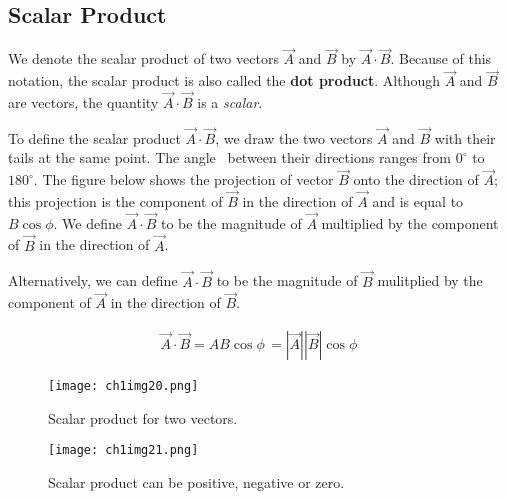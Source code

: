 \subsection*{Scalar Product}
We denote the scalar product of two vectors $\overrightarrow{A}$ and $\overrightarrow{B}$ by $\overrightarrow{A} \cdot \overrightarrow{B}$. Because of this notation, the scalar product is also called the \textbf{dot product}. Although $\overrightarrow{A}$ and $\overrightarrow{B}$ are vectors, the quantity $\overrightarrow{A} \cdot \overrightarrow{B}$ is a \textit{scalar}.

To define the scalar product $\overrightarrow{A} \cdot \overrightarrow{B}$, we draw the two vectors $\overrightarrow{A}$ and $\overrightarrow{B}$ with their tails at the same point. The angle \phi\, between their directions ranges from $0^\circ$ to $180^\circ$. The figure below shows the projection of vector $\overrightarrow{B}$ onto the direction of $\overrightarrow{A}$; this projection is the component of $\overrightarrow{B}$ in the direction of $\overrightarrow{A}$ and is equal to $B\cos\phi$. We define $\overrightarrow{A} \cdot \overrightarrow{B}$ to be the magnitude of $\overrightarrow{A}$ multiplied by the component of $\overrightarrow{B}$ in the direction of $\overrightarrow{A}$.

Alternatively, we can define $\overrightarrow{A} \cdot \overrightarrow{B}$ to be the magnitude of $\overrightarrow{B}$ mulitplied by the component of $\overrightarrow{A}$ in the direction of $\overrightarrow{B}$.

\begin{mathbox}
\begin{align*}
\overrightarrow{A} \cdot \overrightarrow{B} = AB\cos\phi\, = \left| \overrightarrow{A}\right| \left| \overrightarrow{B}\right| \cos\phi\,
\end{align*}
\end{mathbox}

\begin{figure}[ht]
  \centering
  \begin{minipage}[b]{0.4\linewidth}
    \texttt{[image: ch1img20.png]}
    \caption{Scalar product for two vectors.}
    \label{fig:image1}
  \end{minipage}
  \hfill %
  \begin{minipage}[b]{0.45\linewidth}
    \texttt{[image: ch1img21.png]}
    \caption{Scalar product can be positive, negative or zero.}
    \label{fig:image2}
  \end{minipage}
\end{figure}


